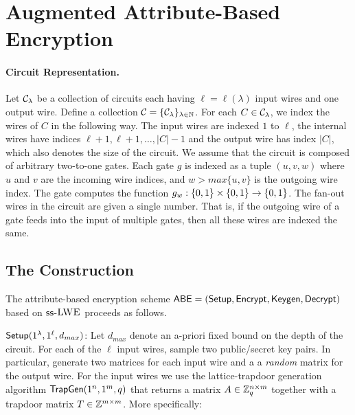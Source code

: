 \section{Augmented Attribute-Based Encryption}\label{ABE}

\paragraph{Circuit Representation.} Let $\mathcal{C}_\lambda$ be a collection of circuits each having $\ell=\ell(\lambda)$ input wires
and one output wire. Define a collection $\mathcal{C} = \{\mathcal{C}_\lambda\}_{\lambda\in\mathbb{N}}$. For each  $C\in \mathcal{C}_\lambda$, we index the wires of $C$ in the following way. The input wires are indexed $1$ to $\ell$, the internal wires have indices
$\ell+1,\ell+1,\ldots,|C|-1$ and the output wire has index $|C|$, which also denotes the size of the circuit.
We assume that the circuit is composed of arbitrary two-to-one gates. Each gate $g$ is indexed as a tuple $(u, v,w)$ where $u$ and $v$ are the incoming wire indices, and $w > max\{u, v\}$ is the outgoing
wire index. The gate computes the function $g_w : \{0,1\}\times\{0,1\}\rightarrow \{0,1\}$. The fan-out wires in
the circuit are given a single number. That is, if the outgoing wire of a gate feeds into the input of
multiple gates, then all these wires are indexed the same.


\subsection{The Construction}

The attribute-based encryption scheme $\textsf{ABE} = ({\mathsf{Setup}}, {\mathsf{Encrypt}}, \mathsf{Keygen}, \mathsf{Decrypt})$ based on $\sf{ss}$-$\textsc{LWE}$ proceeds as follows.
\BI

\item ${\mathsf{Setup}}(1^\lambda,1^\ell,d_{max})$: Let $d_{max}$ denote an a-priori fixed bound on the depth of the circuit. For each of the $\ell$ input wires, sample two public/secret key pairs. In particular, generate two matrices for each input wire and a a \emph{random} matrix for the output wire. For the
input wires we use the lattice-trapdoor generation algorithm ${\mathsf{TrapGen}}(1^n,1^m,q)$ that returns a matrix
$A \in \mathbb{Z}_q^{n\times m}$ together with a trapdoor matrix $T\in \mathbb{Z}^{m\times m}$. More specifically: 

